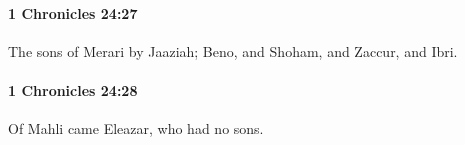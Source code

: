 		\paragraph{1 Chronicles 24:27} %
			\label{1CHRONICLES-24-27}

			The sons of Merari by Jaaziah; Beno, and Shoham, and Zaccur, and Ibri.


		\paragraph{1 Chronicles 24:28} %
			\label{1CHRONICLES-24-28}

			Of Mahli came Eleazar, who had no sons.


